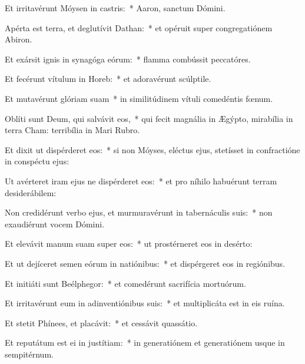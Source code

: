 
\item Et irritavérunt Móysen in castris:~* Aaron, sanctum Dómini.

\item Apérta est terra, et deglutívit Dathan:~* et opéruit super congregatiónem Abiron.

\item Et exársit ignis in synagóga eórum:~* flamma combússit peccatóres.

\item Et fecérunt vítulum in Horeb:~* et adoravérunt scúlptile.

\item Et mutavérunt glóriam suam~* in similitúdinem vítuli comedéntis fœnum.

\item Oblíti sunt Deum, qui salvávit eos,~* qui fecit magnália in Ægýpto, mirabília in terra Cham: terribília in Mari Rubro.

\item Et dixit ut dispérderet eos:~* si non Móyses, eléctus ejus, stetísset in confractióne in conspéctu ejus:

\item Ut avérteret iram ejus ne dispérderet eos:~* et pro níhilo habuérunt terram desiderábilem:

\item Non credidérunt verbo ejus, et murmuravérunt in tabernáculis suis:~* non exaudiérunt vocem Dómini.

\item Et elevávit manum suam super eos:~* ut prostérneret eos in desérto:

\item Et ut dejíceret semen eórum in natiónibus:~* et dispérgeret eos in regiónibus.

\item Et initiáti sunt Beélphegor:~* et comedérunt sacrifícia mortuórum.

\item Et irritavérunt eum in adinventiónibus suis:~* et multiplicáta est in eis ruína.

\item Et stetit Phínees, et placávit:~* et cessávit quassátio.

\item Et reputátum est ei in justítiam:~* in generatiónem et generatiónem usque in sempitérnum.
